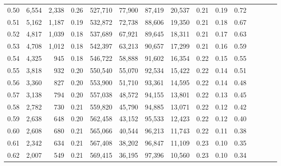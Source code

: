 \begin{tabular}{rrrcrrrrrrrrrrr}
0.50 &   6,554 &   2,338 &                                       0.26 &  527,710 &   77,900 &   87,419 &   20,537 &  0.21 &  0.19 &                         0.72 \\
0.51 &   5,162 &   1,187 &                                       0.19 &  532,872 &   72,738 &   88,606 &   19,350 &  0.21 &  0.18 &                         0.67 \\
0.52 &   4,817 &   1,039 &                                       0.18 &  537,689 &   67,921 &   89,645 &   18,311 &  0.21 &  0.17 &                         0.63 \\
0.53 &   4,708 &   1,012 &                                       0.18 &  542,397 &   63,213 &   90,657 &   17,299 &  0.21 &  0.16 &                         0.59 \\
0.54 &   4,325 &     945 &                                       0.18 &  546,722 &   58,888 &   91,602 &   16,354 &  0.22 &  0.15 &                         0.55 \\
0.55 &   3,818 &     932 &                                       0.20 &  550,540 &   55,070 &   92,534 &   15,422 &  0.22 &  0.14 &                         0.51 \\
0.56 &   3,360 &     827 &                                       0.20 &  553,900 &   51,710 &   93,361 &   14,595 &  0.22 &  0.14 &                         0.48 \\
0.57 &   3,138 &     794 &                                       0.20 &  557,038 &   48,572 &   94,155 &   13,801 &  0.22 &  0.13 &                         0.45 \\
0.58 &   2,782 &     730 &                                       0.21 &  559,820 &   45,790 &   94,885 &   13,071 &  0.22 &  0.12 &                         0.42 \\
0.59 &   2,638 &     648 &                                       0.20 &  562,458 &   43,152 &   95,533 &   12,423 &  0.22 &  0.12 &                         0.40 \\
0.60 &   2,608 &     680 &                                       0.21 &  565,066 &   40,544 &   96,213 &   11,743 &  0.22 &  0.11 &                         0.38 \\
0.61 &   2,342 &     634 &                                       0.21 &  567,408 &   38,202 &   96,847 &   11,109 &  0.23 &  0.10 &                         0.35 \\
0.62 &   2,007 &     549 &                                       0.21 &  569,415 &   36,195 &   97,396 &   10,560 &  0.23 &  0.10 &                         0.34 \\

\end{tabular}
